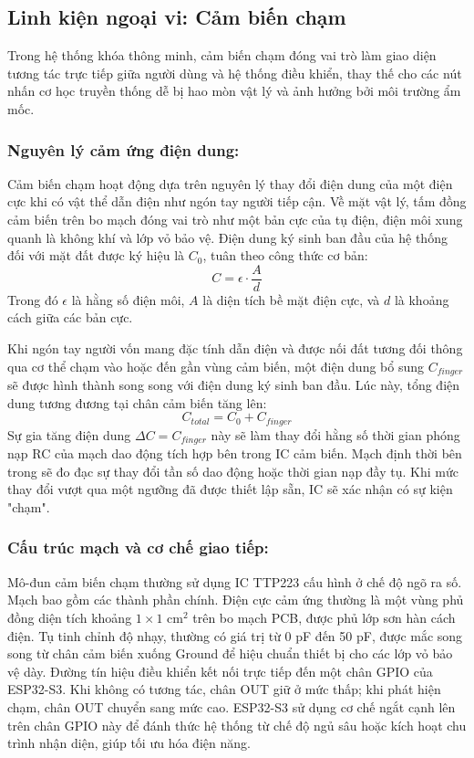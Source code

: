 \subsection{Linh kiện ngoại vi: Cảm biến chạm}

Trong hệ thống khóa thông minh, cảm biến chạm đóng vai trò làm giao diện tương tác trực tiếp giữa người dùng và hệ thống điều khiển, thay thế cho các nút nhấn cơ học truyền thống dễ bị hao mòn vật lý và ảnh hưởng bởi môi trường ẩm mốc.

\subsubsection{Nguyên lý cảm ứng điện dung:}
Cảm biến chạm hoạt động dựa trên nguyên lý thay đổi điện dung của một điện cực khi có vật thể dẫn điện như ngón tay người tiếp cận. Về mặt vật lý, tấm đồng cảm biến trên bo mạch đóng vai trò như một bản cực của tụ điện, điện môi xung quanh là không khí và lớp vỏ bảo vệ. Điện dung ký sinh ban đầu của hệ thống đối với mặt đất được ký hiệu là $C_0$, tuân theo công thức cơ bản:
\begin{equation}
    C = \epsilon \cdot \frac{A}{d}
\end{equation}
Trong đó $\epsilon$ là hằng số điện môi, $A$ là diện tích bề mặt điện cực, và $d$ là khoảng cách giữa các bản cực.

Khi ngón tay người vốn mang đặc tính dẫn điện và được nối đất tương đối thông qua cơ thể chạm vào hoặc đến gần vùng cảm biến, một điện dung bổ sung $C_{finger}$ sẽ được hình thành song song với điện dung ký sinh ban đầu. Lúc này, tổng điện dung tương đương tại chân cảm biến tăng lên:
\begin{equation}
    C_{total} = C_0 + C_{finger}
\end{equation}
Sự gia tăng điện dung $\Delta C = C_{finger}$ này sẽ làm thay đổi hằng số thời gian phóng nạp RC của mạch dao động tích hợp bên trong IC cảm biến. Mạch định thời bên trong sẽ đo đạc sự thay đổi tần số dao động hoặc thời gian nạp đầy tụ. Khi mức thay đổi vượt qua một ngưỡng đã được thiết lập sẵn, IC sẽ xác nhận có sự kiện "chạm".

\subsubsection{Cấu trúc mạch và cơ chế giao tiếp:}
Mô-đun cảm biến chạm thường sử dụng IC TTP223 cấu hình ở chế độ ngõ ra số. Mạch bao gồm các thành phần chính. Điện cực cảm ứng thường là một vùng phủ đồng diện tích khoảng $1 \times 1 \text{ cm}^2$ trên bo mạch PCB, được phủ lớp sơn hàn cách điện. Tụ tinh chỉnh độ nhạy, thường có giá trị từ 0 pF đến 50 pF, được mắc song song từ chân cảm biến xuống Ground để hiệu chuẩn thiết bị cho các lớp vỏ bảo vệ dày. Đường tín hiệu điều khiển kết nối trực tiếp đến một chân GPIO của ESP32-S3. Khi không có tương tác, chân OUT giữ ở mức thấp; khi phát hiện chạm, chân OUT chuyển sang mức cao. ESP32-S3 sử dụng cơ chế ngắt cạnh lên trên chân GPIO này để đánh thức hệ thống từ chế độ ngủ sâu hoặc kích hoạt chu trình nhận diện, giúp tối ưu hóa điện năng.

